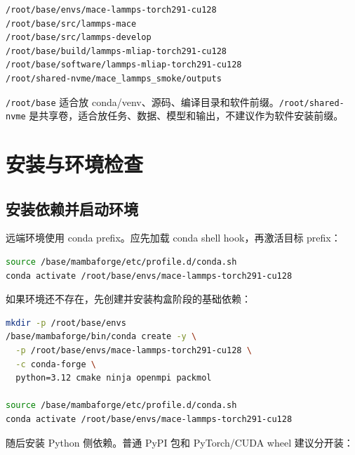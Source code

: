 \documentclass[11pt,a4paper]{article}
\begin{document}
\begin{lstlisting}
/root/base/envs/mace-lammps-torch291-cu128
/root/base/src/lammps-mace
/root/base/src/lammps-develop
/root/base/build/lammps-mliap-torch291-cu128
/root/base/software/lammps-mliap-torch291-cu128
/root/shared-nvme/mace_lammps_smoke/outputs
\end{lstlisting}

\texttt{/root/base} 适合放 conda/venv、源码、编译目录和软件前缀。\texttt{/root/shared-nvme} 是共享卷，适合放任务、数据、模型和输出，不建议作为软件安装前缀。

\section{安装与环境检查}

\subsection{安装依赖并启动环境}

远端环境使用 conda prefix。应先加载 conda shell hook，再激活目标 prefix：

\begin{lstlisting}[language=bash]
source /base/mambaforge/etc/profile.d/conda.sh
conda activate /root/base/envs/mace-lammps-torch291-cu128
\end{lstlisting}

如果环境还不存在，先创建并安装构盒阶段的基础依赖：

\begin{lstlisting}[language=bash]
mkdir -p /root/base/envs
/base/mambaforge/bin/conda create -y \
  -p /root/base/envs/mace-lammps-torch291-cu128 \
  -c conda-forge \
  python=3.12 cmake ninja openmpi packmol

source /base/mambaforge/etc/profile.d/conda.sh
conda activate /root/base/envs/mace-lammps-torch291-cu128
\end{lstlisting}

随后安装 Python 侧依赖。普通 PyPI 包和 PyTorch/CUDA wheel 建议分开装：
\end{document}
